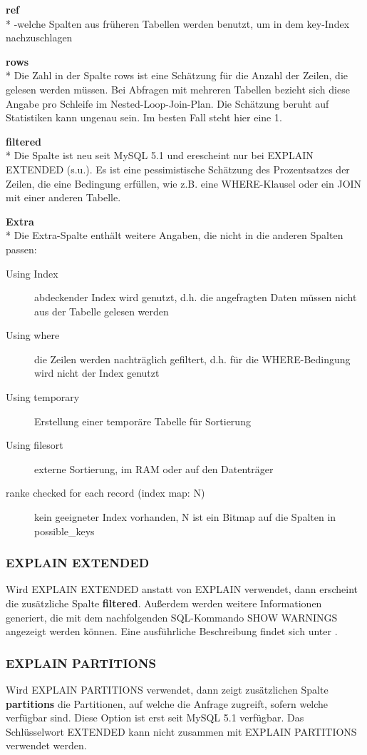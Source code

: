 \textbf{ref}\\*
-welche Spalten aus früheren Tabellen werden benutzt, um in dem key-Index nachzuschlagen

\textbf{rows}\\*
Die Zahl in der Spalte rows ist eine Schätzung für die Anzahl der Zeilen, die gelesen werden müssen.
Bei Abfragen mit mehreren Tabellen bezieht sich diese Angabe pro Schleife im Nested-Loop-Join-Plan.
Die Schätzung beruht auf Statistiken kann ungenau sein. Im besten Fall steht hier eine 1.

\textbf{filtered}\\*
Die Spalte ist neu seit MySQL 5.1 und erescheint nur bei EXPLAIN EXTENDED (s.u.).
Es ist eine pessimistische Schätzung des Prozentsatzes der Zeilen, die eine Bedingung erfüllen, wie z.B. eine WHERE-Klausel oder ein JOIN mit einer anderen Tabelle.

\textbf{Extra}\\*
Die Extra-Spalte enthält weitere Angaben, die nicht in die anderen Spalten passen:
\begin{description}
\item[Using Index] abdeckender Index wird genutzt, d.h. die angefragten Daten müssen nicht aus der Tabelle gelesen werden
\item[Using where] die Zeilen werden nachträglich gefiltert, d.h. für die WHERE-Bedingung wird nicht der Index genutzt
\item[Using temporary] Erstellung einer temporäre Tabelle für Sortierung 
\item[Using filesort] externe Sortierung, im RAM oder auf den Datenträger
\item[ranke checked for each record (index map: N)] kein geeigneter Index vorhanden, N ist ein Bitmap auf die Spalten in possible\_keys
\end{description}

\subsubsection{EXPLAIN EXTENDED}
Wird EXPLAIN EXTENDED anstatt von EXPLAIN verwendet, dann erscheint die zusätzliche Spalte \textbf{filtered}.
Außerdem werden weitere Informationen generiert, die mit dem nachfolgenden SQL-Kommando SHOW WARNINGS angezeigt werden können.
Eine ausführliche Beschreibung findet sich unter \cite{refman3}.

\subsubsection{EXPLAIN PARTITIONS}
Wird EXPLAIN PARTITIONS verwendet, dann zeigt zusätzlichen Spalte \textbf{partitions} die Partitionen, auf welche die Anfrage zugreift, sofern welche verfügbar sind. Diese Option ist erst seit MySQL 5.1 verfügbar.
Das Schlüsselwort EXTENDED kann nicht zusammen mit EXPLAIN PARTITIONS verwendet werden.

